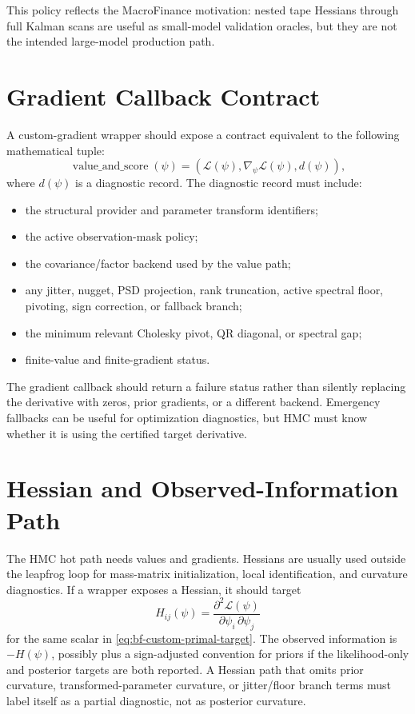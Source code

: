 This policy reflects the MacroFinance motivation: nested tape Hessians through
full Kalman scans are useful as small-model validation oracles, but they are not
the intended large-model production path.

\section{Gradient Callback Contract}
\label{sec:bf-custom-gradient-callback}

A custom-gradient wrapper should expose a contract equivalent to the following
mathematical tuple:
\[
  \operatorname{value\_and\_score}(\psi)
  =
  \left(
    \mathcal{L}(\psi),
    \nabla_\psi\mathcal{L}(\psi),
    d(\psi)
  \right),
\]
where $d(\psi)$ is a diagnostic record.  The diagnostic record must include:
\begin{itemize}
  \item the structural provider and parameter transform identifiers;
  \item the active observation-mask policy;
  \item the covariance/factor backend used by the value path;
  \item any jitter, nugget, PSD projection, rank truncation, active spectral
    floor, pivoting, sign correction, or fallback branch;
  \item the minimum relevant Cholesky pivot, QR diagonal, or spectral gap;
  \item finite-value and finite-gradient status.
\end{itemize}
The gradient callback should return a failure status rather than silently
replacing the derivative with zeros, prior gradients, or a different backend.
Emergency fallbacks can be useful for optimization diagnostics, but HMC must
know whether it is using the certified target derivative.

\section{Hessian and Observed-Information Path}
\label{sec:bf-custom-gradient-hessian-path}

The HMC hot path needs values and gradients.  Hessians are usually used outside
the leapfrog loop for mass-matrix initialization, local identification, and
curvature diagnostics.  If a wrapper exposes a Hessian, it should target
\[
  H_{ij}(\psi)
  =
  \frac{\partial^2\mathcal{L}(\psi)}
       {\partial\psi_i\,\partial\psi_j}
\]
for the same scalar in \eqref{eq:bf-custom-primal-target}.  The observed
information is $-H(\psi)$, possibly plus a sign-adjusted convention for priors
if the likelihood-only and posterior targets are both reported.  A Hessian path
that omits prior curvature, transformed-parameter curvature, or jitter/floor
branch terms must label itself as a partial diagnostic, not as posterior
curvature.

